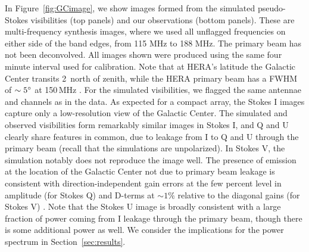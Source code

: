 \documentclass[twocolumn, trackchanges]{aastex61}
\begin{document}
{In Figure~\ref{fig:GCimage}, we show images formed from the simulated pseudo-Stokes visibilities (top panels) and our observations (bottom panels). 
These are multi-frequency synthesis images, where we used all unflagged frequencies on either side of the band edges, from 115 MHz to 188 MHz.  
The primary beam has not been deconvolved. 
All images shown were produced using the same four minute interval used for calibration.
Note that at HERA's latitude the Galactic Center transits 2\arcdeg\ north of zenith, while the HERA primary beam has a FWHM of $\sim5\mbox{$^\circ$}$ at 150\,MHz \citep{Neben.16}. For the simulated visibilities, we flagged the same antennae and channels as in the data. As expected for a compact array, the Stokes I images capture only a low-resolution view of the Galactic Center. The simulated and observed visibilities form remarkably similar images in Stokes I, and Q and U clearly share features in common, due to leakage from I to Q and U through the primary beam (recall that the simulations are unpolarized).  In Stokes V,  the simulation notably does not reproduce the image well. 
The presence of emission at the location of the Galactic Center not due to primary beam leakage is consistent with direction-independent gain errors at the few percent level in amplitude (for Stokes Q) and D-terms at $\sim 1\%$ relative to the diagonal gains (for Stokes V) \citep{TMS}.  Note that the Stokes U image is broadly consistent with a large fraction of power coming from I leakage through the primary beam, though there is some additional power as well.  We consider the implications for the power spectrum in Section~\ref{sec:results}.
}
\end{document}
